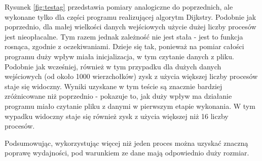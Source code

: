 \documentclass[12pt]{article}
\begin{document}
\vspace{5mm}
Rysunek \ref{fig:testag} przedstawia pomiary analogiczne do poprzednich, ale wykonane tylko dla części programu realizującej algorytm Dijkstry. Podobnie jak poprzednio, dla małej wielkości danych wejściowych użycie dużej liczby procesów jest nieopłacalne. Tym razem jednak zależność nie jest stała - jest to funkcja rosnąca, zgodnie z oczekiwaniami. Dzieje się tak, ponieważ na pomiar całości programu duży wpływ miała inicjalizacja, w tym czytanie danych z pliku. Podobnie jak wcześniej, również w tym przypadku dla dużych danych wejściowych (od około 1000 wierzchołków) zysk z użycia większej liczby procesów staje się widoczny. Wyniki uzyskane w tym teście są znacznie bardziej zróżnicowane niż poprzednio - pokazuje to, jak duży wpływ ma działanie programu miało czytanie pliku z danymi w pierwszym etapie wykonania. W tym wypadku widoczny staje się również zysk z użycia większej niż 16 liczby procesów.

\vspace{5mm}
Podsumowując, wykorzystując więcej niż jeden proces można uzyskać znaczną poprawę wydajności, pod warunkiem ze dane mają odpowiednio duży rozmiar.
\end{document}
